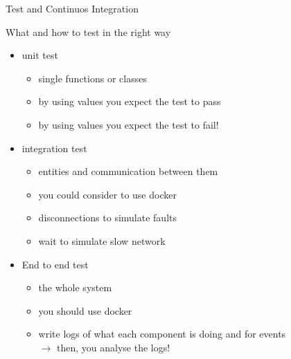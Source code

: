 \documentclass[presentation]{beamer}\mode<presentation>{\usetheme{AMSBolognaFC}}
\begin{document}
\begin{frame}[c,allowframebreaks]{Test and Continuos Integration}
    \begin{block}{What and how to test in the right way}
        \begin{itemize}
            \item unit test
            \begin{itemize}
                \item single functions or classes
                \item by using values you expect the test to pass
                \item by using values you expect the test to \alert{fail!}
            \end{itemize}
            \item integration test
            \begin{itemize}
                \item entities and communication between them
                \item you could consider to use docker
                \item disconnections to simulate faults
                \item wait to simulate slow network
            \end{itemize}
            \item End to end test
            \begin{itemize}
                \item the whole system
                \item you should use docker
                \item write logs of what each component is doing and for events
                \\
                $\rightarrow$ then, you analyse the logs!
            \end{itemize}
        \end{itemize}
    \end{block}
    
\end{frame}

\section*{}
\frame{\titlepage}
\end{document}
